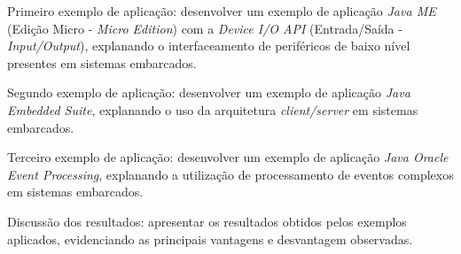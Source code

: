 Primeiro exemplo de aplicação: desenvolver um exemplo de aplicação \textit{Java
  ME} (Edição Micro - \textit{Micro Edition}) com a \textit{Device I/O API}
(Entrada/Saída - \textit{Input/Output}), explanando o interfaceamento de
periféricos de baixo nível presentes em sistemas embarcados.

Segundo exemplo de aplicação: desenvolver um exemplo de aplicação \textit{Java
  Embedded Suite}, explanando o uso da arquitetura \textit{client/server} em
sistemas embarcados.

Terceiro exemplo de aplicação: desenvolver um exemplo de aplicação \textit{Java
  Oracle Event Processing}, explanando a utilização de processamento de eventos
complexos em sistemas embarcados.

Discussão dos resultados: apresentar os resultados obtidos pelos exemplos
aplicados, evidenciando as principais vantagens e desvantagem observadas.

